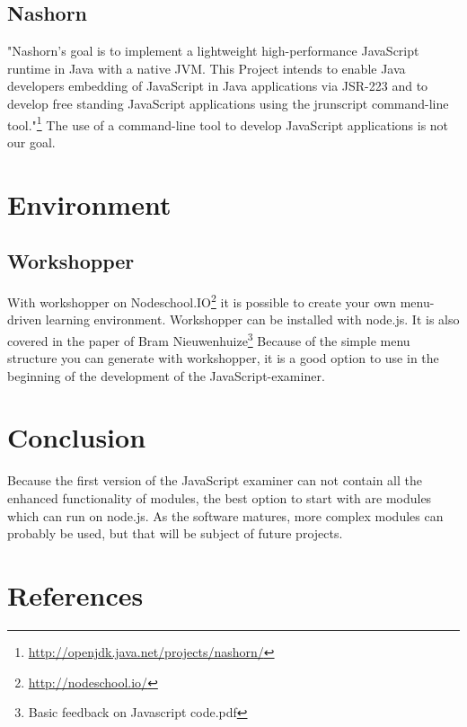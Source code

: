 \documentclass{article}
\begin{document}
\subsection{Nashorn}
"Nashorn's goal is to implement a lightweight high-performance JavaScript runtime in Java with a native JVM.
This Project intends to enable Java developers embedding of JavaScript in Java applications via JSR-223 and to develop 
free standing JavaScript applications using the jrunscript command-line tool."\footnote{\url{http://openjdk.java.net/projects/nashorn/}}
The use of a command-line tool to develop JavaScript applications is not our goal.

\section{Environment}
\subsection{Workshopper}
With workshopper on Nodeschool.IO\footnote{\url{http://nodeschool.io/}} it is possible to create your own menu-driven learning environment. 
Workshopper can be installed with node.js.
It is also covered in the paper of Bram Nieuwenhuize\footnote{Basic feedback on Javascript code.pdf}
Because of the simple menu structure you can generate with workshopper, it is a good option to use in the beginning of the development of the JavaScript-examiner.

\section{Conclusion}
Because the first version of the JavaScript examiner can not contain all the enhanced 
functionality of modules, the best option to start with are modules which can run on node.js.
As the software matures, more complex modules can probably be used, but that will be subject of future projects.

\section{References}
\end{document}
